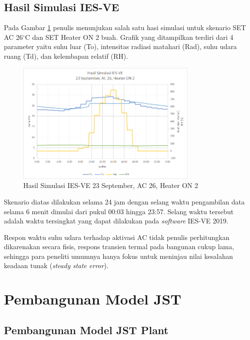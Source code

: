 \subsection{Hasil Simulasi IES-VE}
Pada Gambar \ref{fig:5:HasilIESVE} penulis menunjukan salah satu hasi simulasi untuk skenario SET AC 26$^{\circ}$C dan SET Heater ON 2 buah. Grafik yang ditampilkan terdiri dari 4 parameter yaitu suhu luar (To), intensitas radiasi matahari (Rad), suhu udara ruang (Td), dan kelembapan relatif (RH). 

\begin{figure}[h]
	\centering
	\includegraphics[width=0.8\textwidth]{figures/HasilSimulasiIESVE}
	\caption{Hasil Simulasi IES-VE 23 September, AC 26, Heater ON 2}
	\label{fig:5:HasilIESVE}
\end{figure}

Skenario diatas dilakukan selama 24 jam dengan selang waktu pengambilan data selama 6 menit dimulai dari pukul 00:03 hingga 23:57. Selang waktu tersebut adalah waktu tersingkat yang dapat dilakukan pada \textit{software} IES-VE 2019.

Respon waktu suhu udara terhadap aktivasi AC tidak penulis perhitungkan dikarenakan secara fisis, respons transien termal pada bangunan cukup lama, sehingga para peneliti umumnya hanya fokus untuk meninjau nilai kesalahan keadaan tunak (\textit{steady state error}).

\section{Pembangunan Model JST}

\subsection{Pembangunan Model JST Plant}

